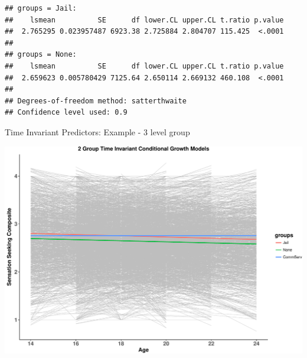 \begin{frame}[fragile]

\begin{Shaded}
\begin{Highlighting}[]
\StringTok{ } \NormalTok{(}\NormalTok{,}\NormalTok{), }
          \NormalTok{, } \NormalTok{, } \NormalTok{))}
\end{Highlighting}
\end{Shaded}

\begin{verbatim}
## groups = Jail:
##    lsmean          SE      df lower.CL upper.CL t.ratio p.value
##  2.765295 0.023957487 6923.38 2.725884 2.804707 115.425  <.0001
## 
## groups = None:
##    lsmean          SE      df lower.CL upper.CL t.ratio p.value
##  2.659623 0.005780429 7125.64 2.650114 2.669132 460.108  <.0001
## 
## Degrees-of-freedom method: satterthwaite 
## Confidence level used: 0.9
\end{verbatim}

\end{frame}

\begin{frame}{Time Invariant Predictors: Example - 3 level group}

\includegraphics{Conditional_Models_files/figure-beamer/unnamed-chunk-38-1.pdf}

\end{frame}

